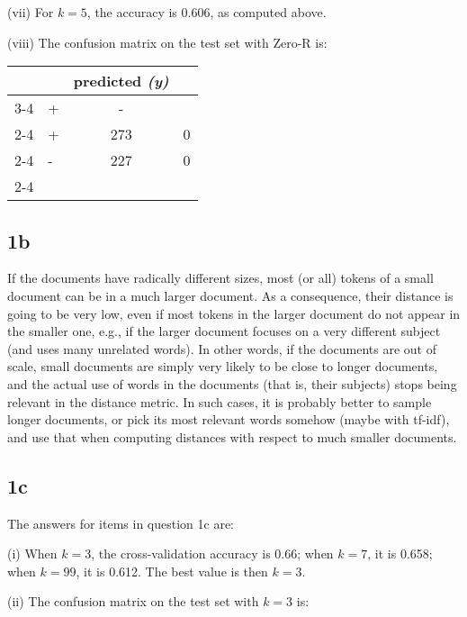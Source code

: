 \documentclass[leqno]{article}
\begin{document}
\hfill

\noindent (vii) For $k = 5$, the accuracy is 0.606, as computed above. %

\hfill

\noindent (viii) The confusion matrix on the test set with Zero-R is:

\begin{tabular}{l|l|c|c|}
\multicolumn{2}{c}{}&\multicolumn{1}{c}{predicted \textit{(y)}}\\
\cline{3-4}
\multicolumn{2}{c|}{}&+&-\\
\cline{2-4}
\multirow{correct \textit{(r)}}& + & 273 & 0\\
\cline{2-4}
& - & 227 & 0 \\
\cline{2-4}
\end{tabular} 

\subsection*{1b} If the documents have radically different sizes, most (or all) tokens of a small document can be in a much larger document. As a consequence, their distance is 
going to be very low, even if most tokens in the larger document do not appear in the smaller one, e.g., if the larger document focuses on a very different subject (and 
uses many  unrelated words). In other words, if the documents are out of scale, small documents are simply very likely to be close to longer documents, and the actual 
use of words in the documents (that is, their subjects) stops being relevant in the distance metric. In such cases, it is probably better to sample longer documents, or pick 
its most relevant words somehow (maybe with tf-idf), and use that when computing distances with respect to much smaller documents.



\subsection*{1c} The answers for items in question 1c are:

\noindent (i) When $k = 3$, the cross-validation accuracy is 0.66; when $k = 7$, it is 0.658; when $k = 99$, it is 0.612. The best value is then $k = 3$.

\hfill

\noindent (ii) The confusion matrix on the test set with $k = 3$ is:
\end{document}
